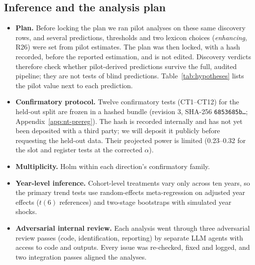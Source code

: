 \subsection{Inference and the analysis plan}
\label{sec:nt-inference}
\begin{itemize}
\item \textbf{Plan.} Before locking the plan we ran pilot analyses on these same discovery rows, and several predictions, thresholds and two lexicon choices (\emph{enhancing}, R26) were set from pilot estimates. The plan was then locked, with a hash recorded, before the reported estimation, and is not edited. Discovery verdicts therefore check whether pilot-derived predictions survive the full, audited pipeline; they are not tests of blind predictions. Table~\ref{tab:hypotheses} lists the pilot value next to each prediction.
\item \textbf{Confirmatory protocol.} Twelve confirmatory tests (CT1--CT12) for the held-out split are frozen in a hashed bundle (revision 3, SHA-256 \texttt{6853685b\dots}; Appendix~\ref{app:nt-prereg}). The hash is recorded internally and has not yet been deposited with a third party; we will deposit it publicly before requesting the held-out data. Their projected power is limited (0.23--0.32 for the slot and register tests at the corrected $\alpha$).
\item \textbf{Multiplicity.} Holm within each direction's confirmatory family.
\item \textbf{Year-level inference.} Cohort-level treatments vary only across ten years, so the primary trend tests use random-effects meta-regression on adjusted year effects ($t(6)$ references) and two-stage bootstraps with simulated year shocks.
\item \textbf{Adversarial internal review.} Each analysis went through three adversarial review passes (code, identification, reporting) by separate LLM agents with access to code and outputs. Every issue was re-checked, fixed and logged, and two integration passes aligned the analyses.
\end{itemize}
